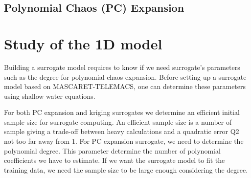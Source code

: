 \documentclass[hidelinks,12pt]{article}
\begin{document}
\subsection{Polynomial Chaos (PC) Expansion}




\section{Study of the 1D model}

Building a surrogate model requires to know if we need surrogate's parameters such as the degree for polynomial chaos expansion. Before setting up a surrogate model based on MASCARET-TELEMACS, one can determine these parameters using shallow water equations.

For both PC expansion and kriging surrogates we determine an efficient initial sample size for surrogate computing. An efficient sample size is a number of sample giving a trade-off between heavy calculations and a quadratic error Q2 not too far away from $1$. For PC expansion surrogate, we need to determine the polynomial degree. This parameter determine the number of polynomial coefficients we have to estimate. If we want the surrogate model to fit the training data, we need the sample size to be large enough considering the degree.


%

\end{document}
